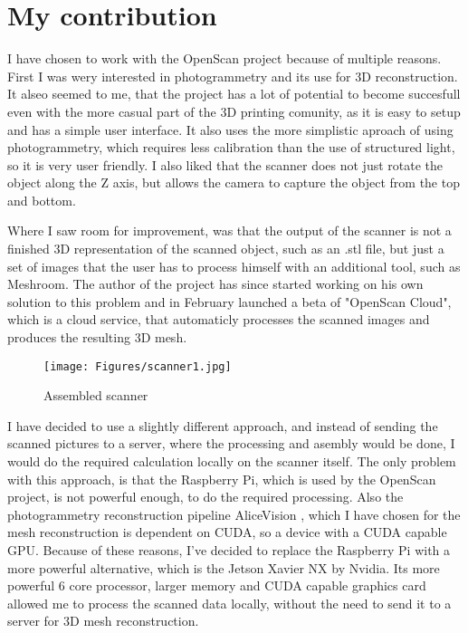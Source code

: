 \chapter{My contribution}
\label{sec:contribution}
I have chosen to work with the OpenScan project because of multiple reasons.
First I was wery interested in photogrammetry and its use for 3D reconstruction.
It alseo seemed to me, that the project has a lot of potential to become succesfull even with the more casual part of the 3D printing comunity, as it is easy to setup and has a simple user interface.
It also uses the more simplistic aproach of using photogrammetry, which requires less calibration than the use of structured light, so it is very user friendly.
I also liked that the scanner does not just rotate the object along the Z axis, but allows the camera to capture the object from the top and bottom.

Where I saw room for improvement, was that the output of the scanner is not a finished 3D representation of the scanned object, such as an .stl file, but just a set of images that the user has to process himself with an additional tool, such as Meshroom.
The author of the project has since started working on his own solution to this problem and in February launched a beta of "OpenScan Cloud", which is a cloud service, that automaticly processes the scanned images and produces the resulting 3D mesh. \cite{openscanCloud}

\begin{figure}[h!]
	\centering
	\texttt{[image: Figures/scanner1.jpg]}	
	\caption{Assembled scanner}
\end{figure}

I have decided to use a slightly different approach, and instead of sending the scanned pictures to a server, where the processing and asembly would be done, I would do the required calculation locally on the scanner itself.
The only problem with this approach, is that the Raspberry Pi, which is used by the OpenScan project, is not powerful enough, to do the required processing.
Also the photogrammetry reconstruction pipeline AliceVision \cite{Moulon2012, Jancosek2011}, which I have chosen for the mesh reconstruction is dependent on CUDA, so a device with a CUDA capable GPU.
Because of these reasons, I've decided to replace the Raspberry Pi with a more powerful alternative, which is the Jetson Xavier NX by Nvidia.
Its more powerful 6 core processor, larger memory and CUDA capable graphics card allowed me to process the scanned data locally, without the need to send it to a server for 3D mesh reconstruction.


